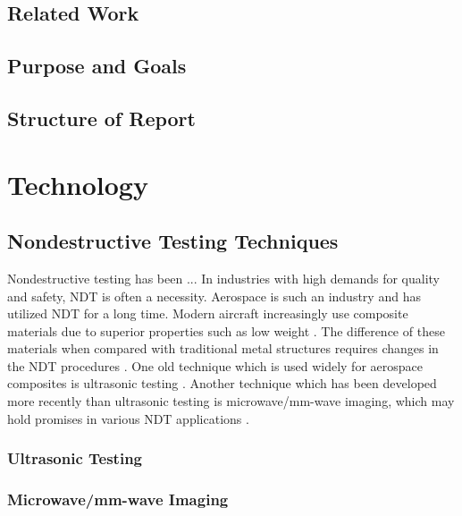 \documentclass[11pt,twoside]{eitExjobb}
\begin{document}
	\section{Related Work}
	
	\section{Purpose and Goals}
	
	\section{Structure of Report}
	
	\chapter{Technology \label{sh:tech}}
	
	\section{Nondestructive Testing Techniques}
	Nondestructive testing has been ... In industries with high demands for quality and safety, NDT is often a necessity. Aerospace is such an industry and has utilized NDT for a long time. \addref Modern aircraft increasingly use composite materials due to superior properties such as low weight \cite{Katunin2015}. The difference of these materials when compared with traditional metal structures requires changes in the NDT procedures \cite{Riegert2006}. One old technique which is used widely for aerospace composites is ultrasonic testing \cite{Garnier2011}. Another technique which has been developed more recently than ultrasonic testing is microwave/mm-wave imaging, which may hold promises in various NDT applications \cite{Kharkovsky2007}.
	
	\subsection{Ultrasonic Testing}
	
	\subsection{Microwave/mm-wave Imaging}
	
\end{document}
